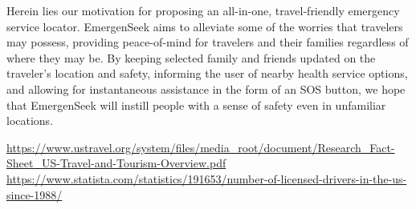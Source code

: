 \documentclass[10pt]{report}
\begin{document}
Herein lies our motivation for proposing an all-in-one, travel-friendly emergency service locator. EmergenSeek aims to alleviate some of the worries that travelers may possess, providing peace-of-mind for travelers and their families regardless of where they may be. By keeping selected family and friends updated on the traveler’s location and safety, informing the user of nearby health service options, and allowing for instantaneous assistance in the form of an SOS button, we hope that EmergenSeek will instill people with a sense of safety even in unfamiliar locations.


\begin{thebibliography}{9}
\url{https://www.ustravel.org/system/files/media_root/document/Research_Fact-Sheet_US-Travel-and-Tourism-Overview.pdf}
\url{https://www.statista.com/statistics/191653/number-of-licensed-drivers-in-the-us-since-1988/}
\end{thebibliography}
\end{document}
